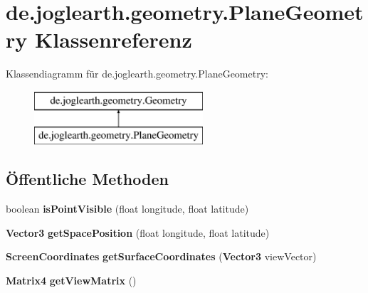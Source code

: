 \section{de.\-joglearth.\-geometry.\-Plane\-Geometry Klassenreferenz}
\label{classde_1_1joglearth_1_1geometry_1_1_plane_geometry}
Klassendiagramm für de.\-joglearth.\-geometry.\-Plane\-Geometry\-:\begin{figure}[H]
\begin{center}
\leavevmode
\includegraphics[height=2.000000cm]{classde_1_1joglearth_1_1geometry_1_1_plane_geometry}
\end{center}
\end{figure}
\subsection*{Öffentliche Methoden}
\begin{DoxyCompactItemize}
\item 
boolean {\bfseries is\-Point\-Visible} (float longitude, float latitude)\label{classde_1_1joglearth_1_1geometry_1_1_plane_geometry_a66a12f3965886a1488a658e046e726fd}

\item 
{\bf Vector3} {\bfseries get\-Space\-Position} (float longitude, float latitude)\label{classde_1_1joglearth_1_1geometry_1_1_plane_geometry_a14b781123b2815a789ed1120d2b4bdeb}

\item 
{\bf Screen\-Coordinates} {\bfseries get\-Surface\-Coordinates} ({\bf Vector3} view\-Vector)\label{classde_1_1joglearth_1_1geometry_1_1_plane_geometry_a75b2822c69800fb287274d37ec397784}

\item 
{\bf Matrix4} {\bfseries get\-View\-Matrix} ()\label{classde_1_1joglearth_1_1geometry_1_1_plane_geometry_a27f961bb318adbeec26f5cb930a35877}

\end{DoxyCompactItemize}
